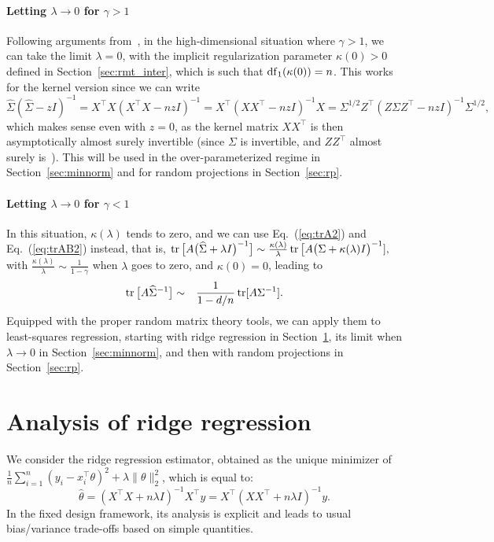\documentclass[11pt]{article}
\newcommand{\BEAS}{\begin{eqnarray*}}
\newcommand{\EEAS}{\end{eqnarray*}}
\newcommand{\BEA}{\begin{eqnarray}}
\newcommand{\EEA}{\end{eqnarray}}
\newcommand{\tr}{\mathop{ \rm tr}}
\newcommand{\idm}{I}
\newcommand{\mysec}[1]{Section~\ref{sec:#1}}
\newcommand{\eq}[1]{Eq.~(\ref{eq:#1})}
\def \hS{ \widehat{ \Sigma} }
\def \S{  { \Sigma} }
\begin{document}
 \paragraph{Letting $\lambda \to 0$ for $\gamma > 1$}
 Following arguments from~\cite[Lemma 6.2]{dobriban2018high}, in the high-dimensional situation where $\gamma>1$, we can take the limit $\lambda=0$, with the implicit regularization parameter $\kappa(0)>0$ defined in \mysec{rmt_inter}, which is such that ${\rm df}_1(\kappa(0))=n$.
 This works for the kernel version since we can write
 $$\hS ( \hS - z \idm)^{-1} = X^\top X ( X^\top X - nz \idm)^{-1} = X^\top  ( XX^\top   - nz \idm)^{-1} X
 = \Sigma^{1/2} Z^\top (Z \Sigma Z^\top - nz \idm)^{-1} \Sigma^{1/2},  $$
 which makes sense even with $z=0$, as the kernel matrix $XX^\top$ is then asymptotically almost surely invertible (since $\Sigma$ is invertible, and $ZZ^\top$ almost surely is~\cite{bai2008limit}). This will be used in the over-parameterized regime in \mysec{minnorm} and for random projections in \mysec{rp}.
 
  
 \paragraph{Letting $\lambda \to 0$ for $\gamma <1$} In this situation, $\kappa(\lambda)$ tends to zero, and we can use \eq{trA2} and \eq{trAB2} instead, that is, 
  $
\tr \big[ A \big( \hS + \lambda \idm \big)^{-1} \big] 
 \sim   \frac{\kappa(\lambda) }{\lambda  } \tr \big[ A \big(  \S + \kappa(\lambda)\idm \big)^{-1} ],
$ 
with $\frac{\kappa(\lambda) }{\lambda  } \sim \frac{1}{1-\gamma}$ when $\lambda$ goes to zero, and $\kappa(0)=0$, leading to 
 \BEA
\label{eq:traces1cov} \tr \big[ A  \hS  ^{-1} \big] 
& \sim &  \frac{1}{1-d/n  } \tr  [ A    \S  ^{-1} ].
\EEA
Equipped with the proper random matrix theory tools, we can apply them to least-squares regression, starting with ridge regression in \mysec{ridge}, its limit when $\lambda \to 0$ in \mysec{minnorm}, and then with random projections in \mysec{rp}.
    


\section{Analysis of ridge regression}
\label{sec:ridge}
We consider the ridge regression estimator, obtained as the unique minimizer of $\frac{1}{n} \sum_{i=1}^n ( y_i - x_i^\top \theta)^2 + \lambda \| \theta\|_2^2$, which is equal to:
$$
\hat{\theta} = (X^\top X + n \lambda \idm)^{-1} X^\top y= X^\top (XX^\top  + n \lambda \idm)^{-1}  y.
$$
In the fixed design framework, its analysis is explicit and leads to usual bias/variance trade-offs based on simple quantities.
\end{document}
